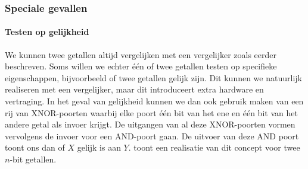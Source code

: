 \subsubsection{Speciale gevallen}
\paragraph{Testen op gelijkheid}
We kunnen twee getallen altijd vergelijken met een vergelijker zoals eerder beschreven. Soms willen we echter \'e\'en of twee getallen testen op specifieke eigenschappen, bijvoorbeeld of twee getallen gelijk zijn. Dit kunnen we natuurlijk realiseren met een vergelijker, maar dit introduceert extra hardware en vertraging. In het geval van gelijkheid kunnen we dan ook gebruik maken van een rij van XNOR-poorten waarbij elke poort \'e\'en bit van het ene en \'e\'en bit van het andere getal als invoer krijgt. De uitgangen van al deze XNOR-poorten vormen vervolgens de invoer voor een AND-poort gaan. De uitvoer van deze AND poort toont ons dan of $X$ gelijk is aan $Y$.  toont een realisatie van dit concept voor twee $n$-bit getallen.

